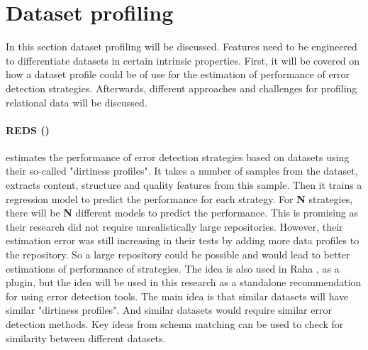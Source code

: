\section{Dataset profiling}
In this section dataset profiling will be discussed. Features need to be engineered to differentiate datasets in certain intrinsic properties. First, it will be covered on how a dataset profile could be of use for the estimation of performance of error detection strategies. Afterwards, different approaches and challenges for profiling relational data will be discussed.

\paragraph{REDS (\cite{Mahdavi2019-pk})} estimates the performance of error detection strategies based on datasets using their so-called "dirtiness profiles". It takes a number of samples from the dataset, extracts content, structure and quality features from this sample. Then it trains a regression model to predict the performance for each strategy. For \textbf{N} strategies, there will be \textbf{N} different models to predict the performance.
This is promising as their research did not require unrealistically large repositories. However, their estimation error was still increasing in their tests by adding more data profiles to the repository.
So a large repository could be possible and would lead to better estimations of performance of strategies.
The idea is also used in Raha \cite{Mahdavi2019-zf}, as a plugin, but the idea will be used in this research as a standalone recommendation for using error detection tools. The main idea is that similar datasets will have similar "dirtiness profiles". And similar datasets would require similar error detection methods. Key ideas from schema matching can be used to check for similarity between different datasets.

